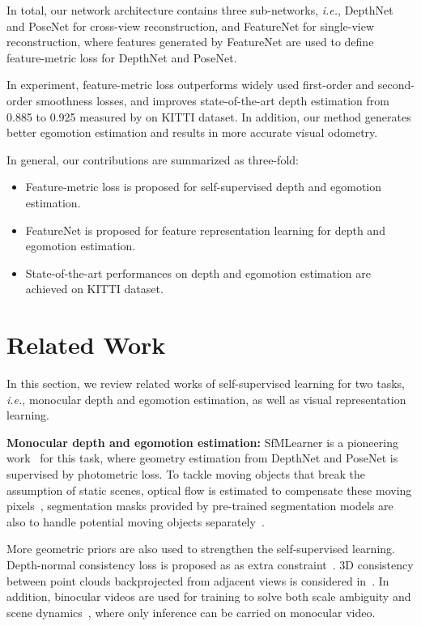 \documentclass[runningheads]{llncs}
\def\ie{\emph{i.e.}}
\begin{document}
In total, our network architecture contains three sub-networks, \ie, DepthNet and PoseNet for cross-view reconstruction, and FeatureNet for single-view reconstruction, where features generated by FeatureNet are used to define feature-metric loss for DepthNet and PoseNet.

In experiment, feature-metric loss outperforms widely used first-order and second-order smoothness losses, and improves state-of-the-art depth estimation from 0.885 to 0.925 measured by  on KITTI dataset. 
In addition, our method generates better egomotion estimation and results in more accurate visual odometry.

In general, our contributions are summarized as three-fold:
\begin{itemize}
\item Feature-metric loss is proposed for self-supervised depth and egomotion estimation.
\item FeatureNet is proposed for feature representation learning for depth and egomotion estimation. 
\item State-of-the-art performances on depth and egomotion estimation are achieved on KITTI dataset.
\end{itemize} \section{Related Work}
\label{rw}

In this section, we review related works of self-supervised learning for two tasks, \ie, monocular depth and egomotion estimation, as well as visual representation learning.



\noindent
\textbf{Monocular depth and egomotion estimation:} 
SfMLearner is a pioneering work~\cite{sfmlearner} for this task, where geometry estimation from DepthNet and PoseNet is supervised by photometric loss. To tackle moving objects that break the assumption of static scenes, optical flow is estimated to compensate these moving pixels~\cite{GeoNet,epc,epc++,dfnet}, segmentation masks provided by pre-trained segmentation models are also to handle potential moving objects separately~\cite{struct2depth,signet,learnk}.

More geometric priors are also used to strengthen the self-supervised learning. Depth-normal consistency loss is proposed as as extra constraint~\cite{lego,dnc}. 3D consistency between point clouds backprojected from adjacent views is considered in~\cite{vid2deep,glnet,sc-sfmlearner}. In addition, binocular videos are used for training to solve both scale ambiguity and scene dynamics~\cite{undeepvo,monodepth2,epc,epc++}, where only inference can be carried on monocular video.
\end{document}
